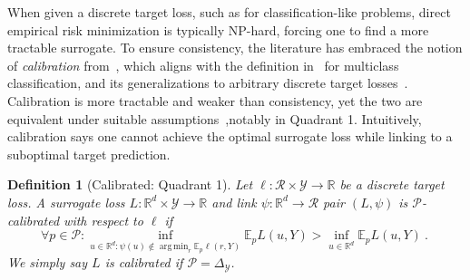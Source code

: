 \documentclass[11pt]{article} %
\newcommand{\reals}{\mathbb{R}}
\newcommand{\simplex}{\Delta_\Y}
\newcommand{\E}{\mathbb{E}}
\newcommand{\R}{\mathcal{R}}
\renewcommand{\P}{\mathcal{P}}
\newcommand{\Y}{\mathcal{Y}}
\newcommand{\exploss}[3]{\E_{#3} #1(#2,Y)}
\newtheorem{definition}{Definition}
\DeclareMathOperator*{\argmin}{arg\,min}
\begin{document}
When given a discrete target loss, such as for classification-like problems, direct empirical risk minimization is typically NP-hard, forcing one to find a more tractable surrogate.
To ensure consistency, the literature has embraced the notion of \emph{calibration} from~\citet[Chapter 3]{steinwart2008support}, which aligns with the definition in~\citet{tewari2007consistency} for multiclass classification, and its generalizations to arbitrary discrete target losses~\citep{agarwal2015consistent,ramaswamy2016convex}.
Calibration is more tractable and weaker than consistency, yet the two are equivalent under suitable assumptions~\citep{tewari2007consistency,ramaswamy2016convex},notably in Quadrant 1.
Intuitively, calibration says one cannot achieve the optimal surrogate loss while linking to a suboptimal target prediction.


\begin{definition}[Calibrated: Quadrant 1]\label{def:calibrated-finite}
	Let $\ell : \R \times \Y \to \reals$ be a discrete target loss.
	A surrogate loss $L : \reals^d \times \Y \to \reals$  and link $\psi:\reals^d \to \R$ pair $(L, \psi)$ is \emph{$\P$-calibrated with respect to} $\ell$ if 
	\begin{equation}\label{eq:calibration}
	\forall p \in \P: \inf_{u \in \reals^d : \psi(u) \not \in \argmin_r \E_p\ell(r,Y)} \exploss{L}{u}{p} > \inf_{u \in \reals^d} \exploss{L}{u}{p}~.~
	\end{equation}
	We simply say $L$ is calibrated if $\P = \simplex$.
\end{definition}
\end{document}
